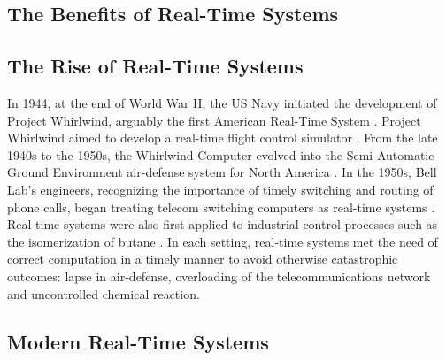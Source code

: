 \subsection{The Benefits of Real-Time Systems}



\subsection{The Rise of Real-Time Systems}


In 1944, at the end of World War II, the US Navy initiated the development of Project Whirlwind, arguably the first American Real-Time System \cite{laplante_historical_1995}.
Project Whirlwind aimed to develop a real-time flight control simulator \cite{forrester_whirlwind_1990}.
From the late 1940s to the 1950s, the Whirlwind Computer evolved into the Semi-Automatic Ground Environment air-defense system for North America \cite{noauthor_tales_nodate}.
In the 1950s, Bell Lab's engineers, recognizing the importance of timely switching and routing of phone calls, began treating telecom switching computers as real-time systems \cite{joel_communication_1957}.
Real-time systems were also first applied to industrial control processes such as the isomerization of butane \cite{harrison_evolution_1981-1}.
In each setting, real-time systems met the need of correct computation in a timely manner to avoid otherwise catastrophic outcomes: lapse in air-defense, overloading of the telecommunications network and uncontrolled chemical reaction.

\subsection{Modern Real-Time Systems}


